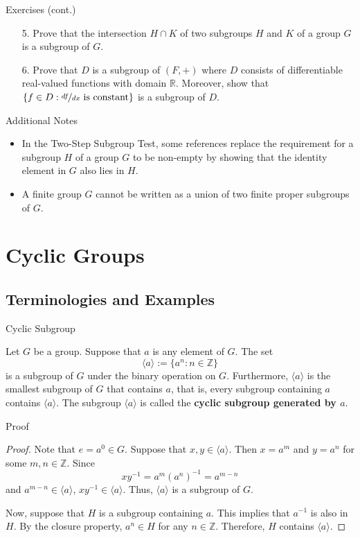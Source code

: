 \documentclass{beamer}
\begin{document}
\begin{frame}{Exercises (cont.)}
\begin{enumerate}
\item[5.] Prove that the intersection $H \cap K$ of two subgroups $H$ and $K$ of a group $G$ is a subgroup of $G$.
\item[6.] Prove that $D$ is a subgroup of $(F, +)$ where $D$ consists of differentiable real-valued functions with domain $\mathbb{R}$. Moreover, show that $\{f \in D: \nicefrac{df}{dx} \text{ is constant}\}$ is a subgroup of $D$.
\end{enumerate}
\end{frame}

\begin{frame}{Additional Notes}
\begin{itemize}
\justifying
\item In the Two-Step Subgroup Test, some references replace the requirement for a subgroup $H$ of a group $G$ to be non-empty by showing that the identity element in $G$ also lies in $H$.  
\item A finite group $G$ cannot be written as a union of two finite proper subgroups of $G$.
\end{itemize}
\end{frame}

\section{Cyclic Groups}

\subsection{Terminologies and Examples}

\begin{frame}{Cyclic Subgroup}
\begin{theorem}
\justifying
Let $G$ be a group. Suppose that $a$ is any element of $G$. The set 
\[
\langle a\rangle := \{a^n : n \in \mathbb{Z}\}
\]
is a subgroup of $G$ under the binary operation on $G$. Furthermore, $\langle a\rangle$ is the smallest subgroup of $G$ that contains $a$, that is, every subgroup containing $a$ contains $\langle a\rangle$. The subgroup $\langle a\rangle$ is called the \textbf{cyclic subgroup generated by $a$}.
\end{theorem}
\end{frame}

\begin{frame}{Proof}
\begin{proof}
\justifying
Note that $e = a^0 \in G$. Suppose that $x, y \in \langle a\rangle$. Then $x = a^m$ and $y = a^n$ for some $m, n \in \mathbb{Z}$. Since 
\[
xy^{-1} = a^m\left(a^n\right)^{-1} = a^{m - n}
\]
and $a^{m-n} \in \langle a\rangle$, $xy^{-1} \in \langle a\rangle$. Thus, $\langle a\rangle$ is a subgroup of $G$.

Now, suppose that $H$ is a subgroup containing $a$. This implies that $a^{-1}$ is also in $H$. By the closure property, $a^n \in H$ for any $n \in \mathbb{Z}$. Therefore, $H$ contains $\langle a\rangle$. 
\end{proof}    
\end{frame}
\end{document}

